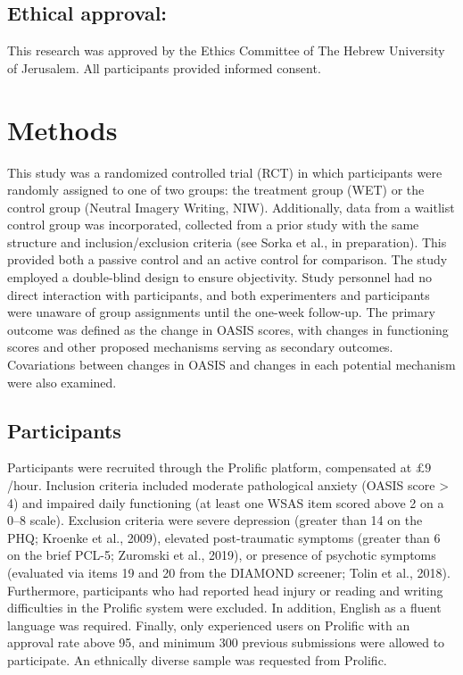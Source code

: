\documentclass[
  man,floatsintext]{apa7}
\begin{document}
\subsection{Ethical approval:}\label{ethical-approval}

This research was approved by the Ethics Committee of The Hebrew University of Jerusalem.
All participants provided informed consent.

\section{Methods}\label{methods}

This study was a randomized controlled trial (RCT) in which participants were randomly assigned to one of two groups: the treatment group (WET) or the control group (Neutral Imagery Writing, NIW).
Additionally, data from a waitlist control group was incorporated, collected from a prior study with the same structure and inclusion/exclusion criteria (see Sorka et al., in preparation).
This provided both a passive control and an active control for comparison.
The study employed a double-blind design to ensure objectivity.
Study personnel had no direct interaction with participants, and both experimenters and participants were unaware of group assignments until the one-week follow-up.
The primary outcome was defined as the change in OASIS scores, with changes in functioning scores and other proposed mechanisms serving as secondary outcomes.
Covariations between changes in OASIS and changes in each potential mechanism were also examined.

\subsection{Participants}\label{participants}

Participants were recruited through the Prolific platform, compensated at \(\pounds 9\)/hour.
Inclusion criteria included moderate pathological anxiety (OASIS score \textgreater{} 4)
and impaired daily functioning (at least one WSAS item scored above 2 on a 0--8 scale).
Exclusion criteria were severe depression (greater than 14 on the PHQ; Kroenke et al., 2009), elevated post-traumatic symptoms (greater than 6 on the brief PCL-5; Zuromski et al., 2019), or presence of psychotic symptoms (evaluated via items 19 and 20 from the DIAMOND screener; Tolin et al., 2018).
Furthermore, participants who had reported head injury or reading and writing difficulties in the Prolific system were excluded.
In addition, English as a fluent language was required.
Finally, only experienced users on Prolific with an approval rate above 95, and minimum 300 previous submissions were allowed to participate.
An ethnically diverse sample was requested from Prolific.
\end{document}
